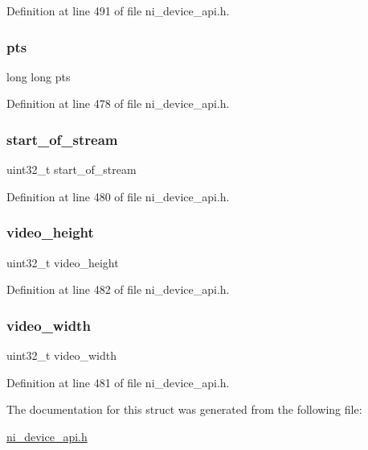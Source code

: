 Definition at line 491 of file ni\+\_\+device\+\_\+api.\+h.

\mbox{\label{struct__ni__frame_aa549d909938aa26820c29b020cd43ad6}} 
\subsubsection{\texorpdfstring{pts}{pts}}
{\footnotesize\ttfamily long long pts}



Definition at line 478 of file ni\+\_\+device\+\_\+api.\+h.

\mbox{\label{struct__ni__frame_a3136d4ad964deb437b6aaadcb031d90f}} 
\subsubsection{\texorpdfstring{start\_of\_stream}{start\_of\_stream}}
{\footnotesize\ttfamily uint32\+\_\+t start\+\_\+of\+\_\+stream}



Definition at line 480 of file ni\+\_\+device\+\_\+api.\+h.

\mbox{\label{struct__ni__frame_af65e7328fad30f40770959957538da7c}} 
\subsubsection{\texorpdfstring{video\_height}{video\_height}}
{\footnotesize\ttfamily uint32\+\_\+t video\+\_\+height}



Definition at line 482 of file ni\+\_\+device\+\_\+api.\+h.

\mbox{\label{struct__ni__frame_a94c61f9d8155afb285177936e9fa30ce}} 
\subsubsection{\texorpdfstring{video\_width}{video\_width}}
{\footnotesize\ttfamily uint32\+\_\+t video\+\_\+width}



Definition at line 481 of file ni\+\_\+device\+\_\+api.\+h.



The documentation for this struct was generated from the following file\+:\begin{DoxyCompactItemize}
\item 
\mbox{\hyperlink{ni__device__api_8h}{ni\+\_\+device\+\_\+api.\+h}}\end{DoxyCompactItemize}
